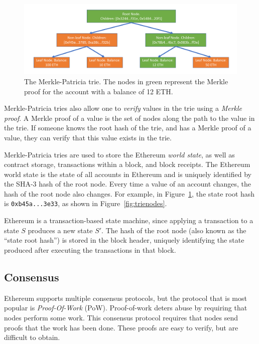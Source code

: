 \documentclass[12pt]{article}
\newcounter{protocol}
\begin{document}
\begin{figure}[H]
  \centering
  \includegraphics[width=\textwidth]{../figures/background/trie/tree_with_merkle_proof.pdf}
  \caption{The Merkle-Patricia trie. The nodes in green represent the Merkle proof for the account with a balance of 12 ETH.} \label{fig:trie}
\end{figure}

Merkle-Patricia tries also allow one to \emph{verify} values in the trie using a \emph{Merkle proof}. A Merkle proof of a value is the set of nodes along the path to the value in the trie. If someone knows the root hash of the trie, and has a Merkle proof of a value, they can verify that this value exists in the trie.


Merkle-Patricia tries are used to store the Ethereum \emph{world state}, as well as contract storage, transactions within a block, and block receipts. The Ethereum world state is the state of all accounts in Ethereum and is uniquely identified by the SHA-3 hash of the root node. Every time a value of an account changes, the hash of the root node also changes. For example, in Figure~\ref{fig:trie}, the state root hash is \texttt{0xb45a...3e33}, as shown in Figure~\ref{fig:trienodes}.

Ethereum is a transaction-based state machine, since applying a transaction to a state $S$ produces a new state $S'$. The hash of the root node (also known as the ``state root hash'') is stored in the block header, uniquely identifying the state produced after executing the transactions in that block.


\subsection{Consensus}
Ethereum supports multiple consensus protocols, but the protocol that is most popular is \emph{Proof-Of-Work} (PoW). Proof-of-work deters abuse by requiring that nodes perform some work. This consensus protocol requires that nodes send proofs that the work has been done. These proofs are easy to verify, but are difficult to obtain.
\end{document}
